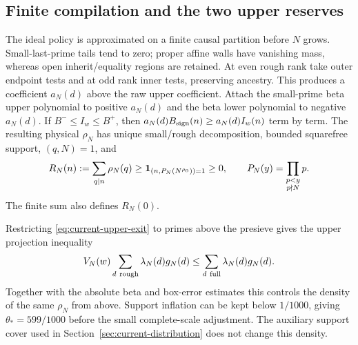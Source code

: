 \subsection{Finite compilation and the two upper reserves}

The ideal policy is approximated on a finite causal partition before
$N$ grows.  Small-last-prime tails tend to zero; proper affine walls
have vanishing mass, whereas open inherit/equality regions are
retained.  At even rough rank take outer endpoint tests and at odd
rank inner tests, preserving ancestry.  This produces a coefficient
$a_N(d)$ above the raw upper coefficient.  Attach the small-prime
beta upper polynomial to positive $a_N(d)$ and the beta lower
polynomial to negative $a_N(d)$.  If $B^-\le I_w\le B^+$, then
$a_N(d)B_{\rm sign}(n)\ge a_N(d)I_w(n)$ term by term.
The resulting physical $\rho_N$ has unique small/rough decomposition,
bounded squarefree support, $(q,N)=1$, and
\begin{equation}
 R_N(n):=\sum_{q\mid n}\rho_N(q)
   \ge {\bf1}_{(n,P_N(N^{\rho_0}))=1}\ge0,
 \qquad P_N(y)=\prod_{\substack{p<y\\p\nmid N}}p.
 \label{eq:current-physical-upper}
\end{equation}
The finite sum also defines $R_N(0)$.

Restricting \eqref{eq:current-upper-exit} to primes above the presieve
gives the upper projection inequality
\[
 V_N(w)\sum_{d\ {\rm rough}}\lambda_N(d)g_N(d)
       \le\sum_{d\ {\rm full}}\lambda_N(d)g_N(d).
\]
Together with the absolute beta and box-error estimates this controls
the density of the same $\rho_N$ from above.  Support inflation can
be kept below $1/1000$, giving $\theta_*=599/1000$ before the small
complete-scale adjustment.  The auxiliary support cover used in
Section~\ref{sec:current-distribution} does not change this density.

